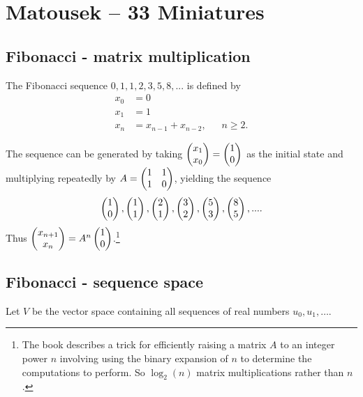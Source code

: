 \section{Matousek -- 33 Miniatures}

\subsection{Fibonacci - matrix multiplication}\label{fibonacci-matrix-multiplication}

\begin{definition*}
  The Fibonacci sequence $0, 1, 1, 2, 3, 5, 8, ...$ is defined by
  \begin{align*}
    x_0 &= 0\\
    x_1 &= 1\\
    x_{n} &= x_{n-1} + x_{n-2}, ~~~~~~~ n \geq 2.
  \end{align*}
\end{definition*}

\begin{remark*}
  The sequence can be generated by taking $\begin{pmatrix}x_1\\x_0\end{pmatrix} = \begin{pmatrix}1\\0\end{pmatrix}$ as the initial state and multiplying
  repeatedly by $A = \begin{pmatrix}1 & 1\\1 & 0\\ \end{pmatrix}$, yielding the sequence
  \begin{align*}
    \begin{pmatrix}1\\0\end{pmatrix}, \begin{pmatrix}1\\1\end{pmatrix}, \begin{pmatrix}2\\1\end{pmatrix}, \begin{pmatrix}3\\2\end{pmatrix}, \begin{pmatrix}5\\3\end{pmatrix}, \begin{pmatrix}8\\5\end{pmatrix}, ....
  \end{align*}
  Thus $\begin{pmatrix}x_{n+1}\\x_n\end{pmatrix} = A^n\begin{pmatrix}1\\0\end{pmatrix}$.\footnote{The book describes a trick for
    efficiently raising a matrix $A$ to an integer power $n$ involving using the binary expansion
    of $n$ to determine the computations to perform. So $\log_2(n)$ matrix multiplications rather
    than $n$.}
\end{remark*}

\newpage
\subsection{Fibonacci - sequence space}

Let $V$ be the vector space containing all sequences of real numbers
$u_0, u_1, \ldots$.

\begin{comment}
  \begin{proof}
    This is a vector space since:
    \begin{enumerate}
    \item It's an Abelian group under addition (the zero sequence is the additive identity, inverse
      is obtained by negating each element, addition is associative and commutative)
    \item Closed under scalar multiplication since $\lambda u_0, \lambda u_1, ... \in V$.
    \end{enumerate}
  \end{proof}
\end{comment}

